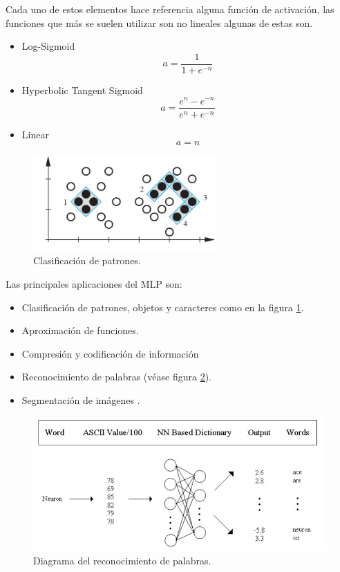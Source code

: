 \documentclass[12pt, titlepage]{article}
\begin{document}
Cada uno de estos elementos hace referencia alguna función de activación, las funciones que más se suelen utilizar son no lineales algunas de estas son.

\begin{itemize}
    \item Log-Sigmoid
    \[ a = \dfrac{1}{1+e^{-n}}\]
    \item Hyperbolic Tangent Sigmoid
    \[ a = \dfrac{e^n - e^{-n}}{e^n + e^{-n}}\]
    \item Linear
    \[ a = n\]
\end{itemize}

\begin{figure}[H]
    \begin{center}
        \includegraphics[width=7cm]{img/patrones.png}
        \caption{Clasificación de patrones. \cite{libro1}}
        \label{fig:clasificacion}
    \end{center}
\end{figure}

Las principales aplicaciones del MLP son:
\begin{itemize}
    \item Clasificación de patrones, objetos y caracteres como en la figura \ref{fig:clasificacion}.
    \item Aproximación de funciones.
    \item Compresión y codificación de información
    \item Reconocimiento de palabras (véase figura \ref{fig:palabras}).
    \item Segmentación de imágenes \cite{pdf}.
\end{itemize}

\begin{figure}[H]
    \begin{center}
        \includegraphics[width=12cm]{img/palabras.png}
        \caption{Diagrama del reconocimiento de palabras. \cite{pdf}}
        \label{fig:palabras}
    \end{center}
\end{figure}
\end{document}
